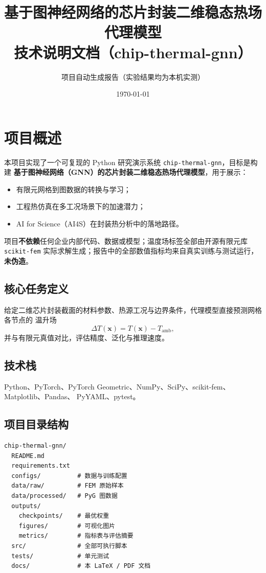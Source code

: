 \documentclass[11pt,a4paper]{article}
\title{\bfseries 基于图神经网络的芯片封装二维稳态热场代理模型\\[0.4em]
\large 技术说明文档（chip-thermal-gnn）}
\author{项目自动生成报告（实验结果均为本机实测）}
\date{\today}
\begin{document}
\maketitle
\tableofcontents
\newpage

\section{项目概述}

本项目实现了一个可复现的 Python 研究演示系统 \texttt{chip-thermal-gnn}，目标是构建
\textbf{基于图神经网络（GNN）的芯片封装二维稳态热场代理模型}，用于展示：
\begin{itemize}[leftmargin=1.5em]
  \item 有限元网格到图数据的转换与学习；
  \item 工程热仿真在多工况场景下的加速潜力；
  \item AI for Science（AI4S）在封装热分析中的落地路径。
\end{itemize}

项目\textbf{不依赖}任何企业内部代码、数据或模型；温度场标签全部由开源有限元库
\texttt{scikit-fem} 实际求解生成；报告中的全部数值指标均来自真实训练与测试运行，
\textbf{未伪造}。

\subsection{核心任务定义}
给定二维芯片封装截面的材料参数、热源工况与边界条件，代理模型直接预测网格各节点的
温升场
\[
\Delta T(\mathbf{x}) = T(\mathbf{x}) - T_{\mathrm{amb}},
\]
并与有限元真值对比，评估精度、泛化与推理速度。

\subsection{技术栈}
Python、PyTorch、PyTorch Geometric、NumPy、SciPy、scikit-fem、Matplotlib、Pandas、
PyYAML、pytest。

\subsection{项目目录结构}
\begin{lstlisting}
chip-thermal-gnn/
  README.md
  requirements.txt
  configs/          # 数据与训练配置
  data/raw/         # FEM 原始样本
  data/processed/   # PyG 图数据
  outputs/
    checkpoints/    # 最优权重
    figures/        # 可视化图片
    metrics/        # 指标表与评估摘要
  src/              # 全部可执行脚本
  tests/            # 单元测试
  docs/             # 本 LaTeX / PDF 文档
\end{lstlisting}
\end{document}
